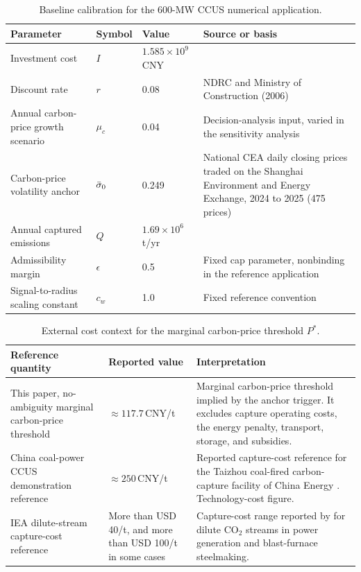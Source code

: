 \begin{table}[!t]
\caption{Baseline calibration for the 600-MW CCUS numerical application.}
\label{tab:calibration}
\centering
\footnotesize
\begin{tabular}{@{}L{0.26\textwidth}L{0.07\textwidth}L{0.16\textwidth}L{0.42\textwidth}@{}}
\toprule
Parameter & Symbol & Value & Source or basis\\
\midrule
Investment cost & $I$ & $1.585\times10^{9}$\,CNY & \citet{Sun2024}\\
Discount rate & $r$ & 0.08 & NDRC and Ministry of Construction (2006)\\
Annual carbon-price growth scenario & $\mu_c$ & 0.04 & Decision-analysis input, varied in the sensitivity analysis\\
Carbon-price volatility anchor & $\bar{\sigma}_0$ & 0.249 & National CEA daily closing prices traded on the Shanghai Environment and Energy Exchange, 2024 to 2025 (475 prices)\\
Annual captured emissions & $Q$ & $1.69\times10^{6}$\,t/yr & \citet{Sun2024}\\
Admissibility margin & $\epsilon$ & 0.5 & Fixed cap parameter, nonbinding in the reference application\\
Signal-to-radius scaling constant & $c_w$ & 1.0 & Fixed reference convention\\
\bottomrule
\end{tabular}
\end{table}

\begin{table}[!t]
\caption{External cost context for the marginal carbon-price threshold $P^{*}$.}
\label{tab:costcontext}
\centering
\footnotesize
\begin{tabular}{@{}L{0.26\textwidth}L{0.2\textwidth}L{0.47\textwidth}@{}}
\toprule
Reference quantity & Reported value & Interpretation\\
\midrule
This paper, no-ambiguity marginal carbon-price threshold & $\approx117.7$\,CNY/t & Marginal carbon-price threshold implied by the anchor trigger. It excludes capture operating costs, the energy penalty, transport, storage, and subsidies.\\
China coal-power CCUS demonstration reference & $\approx250$\,CNY/t & Reported capture-cost reference for the Taizhou coal-fired carbon-capture facility of China Energy \citep{YangX2023}. Technology-cost figure.\\
IEA dilute-stream capture-cost reference & More than USD 40/t, and more than USD 100/t in some cases & Capture-cost range reported by \citet{IEA2020} for dilute CO$_2$ streams in power generation and blast-furnace steelmaking.\\
\bottomrule
\end{tabular}
\end{table}


